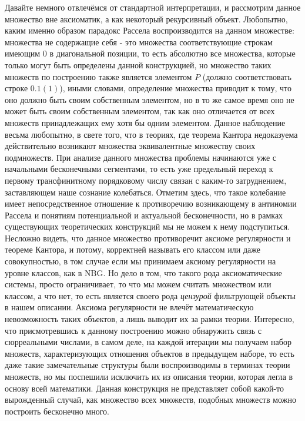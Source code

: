 \documentclass[12pt]{article}
\begin{document}
Давайте немного отвлечёмся от стандартной интерпретации, и рассмотрим данное множество вне аксиоматик, а как некоторый рекурсивный объект. Любопытно, каким именно образом парадокс Рассела воспроизводится на данном множестве: множества не содержащие себя - это множества соответствующие строкам имеющим $0$ в диагональной позиции, то есть абсолютно все множества, которые только могут быть определены данной конструкцией, но множество таких множеств по построению также является элементом $P$ (должно соответствовать строке $0.1(1)$), иными словами, определение множества приводит к тому, что оно должно быть своим собственным элементом, но в то же самое время оно не может быть своим собственным элементом, так как оно отличается от всех множеств принадлежащих ему хотя бы одним элементом. Данное наблюдение весьма любопытно, в свете того, что в теориях, где теорема Кантора недоказуема действительно возникают множества эквивалентные множеству своих подмножеств. При анализе данного множества проблемы начинаются уже с начальными бесконечными сегментами, то есть уже предельный переход к первому трансфинитному порядковому числу связан с каким-то затруднением, заставляющем наше сознание колебаться. Отметим здесь, что такое колебание имеет непосредственное отношение к противоречию возникающему в антиномии Рассела и понятиям потенциальной и актуальной бесконечности, но в рамках существующих теоретических конструкций мы не можем к нему подступиться. Несложно видеть, что данное множество противоречит аксиоме регулярности и теореме Кантора, и потому, корректней называть его классом или даже совокупностью, в том случае если мы принимаем аксиому регулярности на уровне классов, как в NBG. Но дело в том, что такого рода аксиоматические системы, просто ограничивает, то что мы можем считать множеством или классом, а что нет, то есть является своего рода {\it цензурой} фильтрующей объекты в нашем описании. Аксиома регулярности не влечёт математическую невозможность таких объектов, а лишь выводит их за рамки теории. Интересно, что присмотревшись к данному построению можно обнаружить связь с сюрреальными числами, в самом деле, на каждой итерации мы получаем набор множеств, характеризующих отношения объектов в предыдущем наборе, то есть даже такие замечательные структуры были воспроизводимы в терминах теории множеств, но мы поспешили исключить их из описания теории, которая легла в основу всей математики. Данная конструкция не представляет собой какой-то вырожденный случай, как множество всех множеств, подобных множеств можно построить бесконечно много. 
\end{document}
